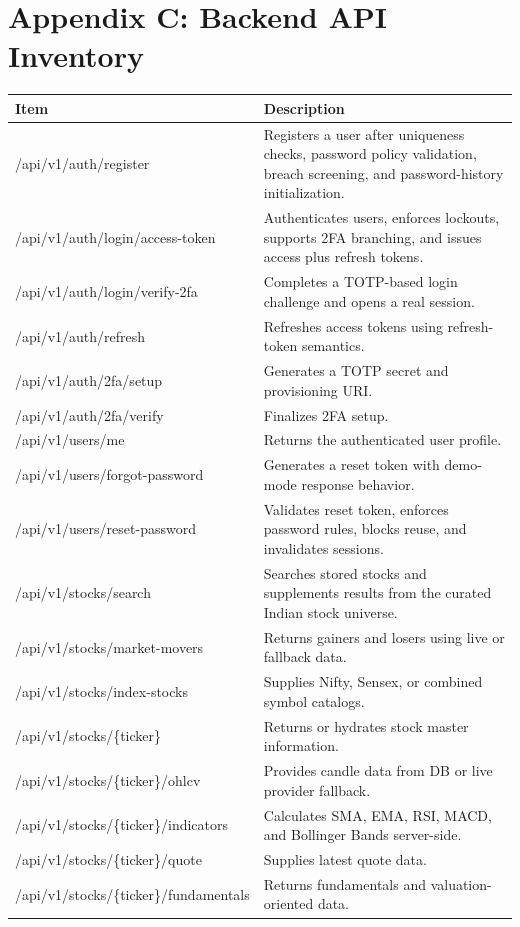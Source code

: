 \documentclass[11pt,a4paper]{article}
\begin{document}
\section*{Appendix C: Backend API Inventory}
\begin{longtable}{p{} p{}}
\textbf{Item} & \textbf{Description} \\ \hline
/api/v1/auth/register & Registers a user after uniqueness checks, password policy validation, breach screening, and password-history initialization. \\
/api/v1/auth/login/access-token & Authenticates users, enforces lockouts, supports 2FA branching, and issues access plus refresh tokens. \\
/api/v1/auth/login/verify-2fa & Completes a TOTP-based login challenge and opens a real session. \\
/api/v1/auth/refresh & Refreshes access tokens using refresh-token semantics. \\
/api/v1/auth/2fa/setup & Generates a TOTP secret and provisioning URI. \\
/api/v1/auth/2fa/verify & Finalizes 2FA setup. \\
/api/v1/users/me & Returns the authenticated user profile. \\
/api/v1/users/forgot-password & Generates a reset token with demo-mode response behavior. \\
/api/v1/users/reset-password & Validates reset token, enforces password rules, blocks reuse, and invalidates sessions. \\
/api/v1/stocks/search & Searches stored stocks and supplements results from the curated Indian stock universe. \\
/api/v1/stocks/market-movers & Returns gainers and losers using live or fallback data. \\
/api/v1/stocks/index-stocks & Supplies Nifty, Sensex, or combined symbol catalogs. \\
/api/v1/stocks/\{ticker\} & Returns or hydrates stock master information. \\
/api/v1/stocks/\{ticker\}/ohlcv & Provides candle data from DB or live provider fallback. \\
/api/v1/stocks/\{ticker\}/indicators & Calculates SMA, EMA, RSI, MACD, and Bollinger Bands server-side. \\
/api/v1/stocks/\{ticker\}/quote & Supplies latest quote data. \\
/api/v1/stocks/\{ticker\}/fundamentals & Returns fundamentals and valuation-oriented data. \\

\end{longtable}
\end{document}
